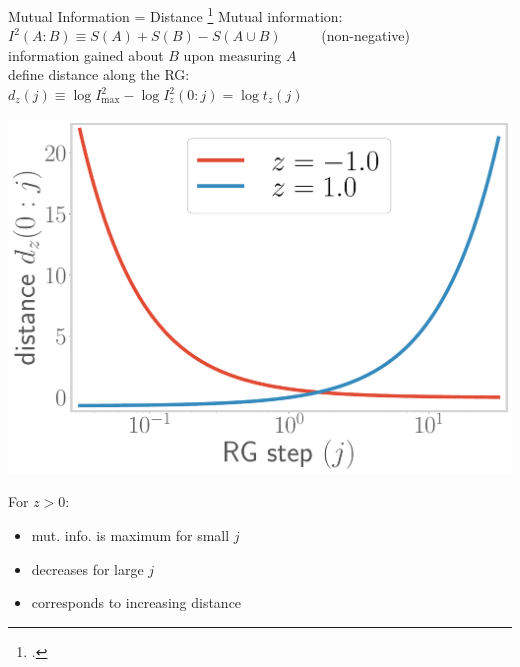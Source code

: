 \documentclass[12pt,aspectratio=169]{beamer}
\begin{document}
\begin{frame}{Mutual Information = Distance}
\footcite{van2010building,lee2016,anirban_mott_2022}
	\alert{Mutual information}: ~ \(I^2(A:B) \equiv S(A) + S(B) - S(A \cup B)\) ~ ~ ~ (non-negative)\\[10pt]
	information gained about \(B\) upon measuring \(A\)\\[10pt]
	define distance along the RG: ~ ~ \(d_z(j) \equiv \log I^2_\text{max} - \log I_z^2(0:j) = \log t_z(j)\)

	\vspace*{\fill}

	\begin{minipage}{0.4\textwidth}
	\includegraphics[width=\textwidth]{figures/distance1.pdf}
	\end{minipage}
	\hspace*{\fill}
	\begin{minipage}{0.55\textwidth}
		\centering
		For \(z > 0\):\\[5pt]
		\begin{itemize}
			\item mut. info. is maximum for small \(j\)\\[10pt]
			\item decreases for large \(j\)\\[10pt]
			\item corresponds to \alert{increasing distance}
		\end{itemize}
	\end{minipage}
\end{frame}
\end{document}
